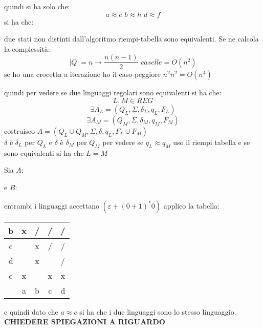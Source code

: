 \documentclass[a4paper,12pt, oneside]{book}
\begin{document}
quindi si ha solo che:
$$a\approx e\,\,b\approx h\,\,d\approx f$$
si ha che:
\begin{teorema}
due stati non distinti dall'algoritmo riempi-tabella sono equivalenti. Se ne calcola la complessità:
$$|Q|=n\to \frac{n(n-1)}{2}\,\,caselle=O(n^2)$$
se ho una crocetta a iterazione ho il caso peggiore $n^2n^2=O(n^4)$
\end{teorema}
quindi per vedere se due linguaggi regolari sono equivalenti si ha che:
$$L,M\in REG$$
$$\exists A_L=(Q_L,\Sigma,\delta_L,q_L,F_L)$$
$$\exists A_M=(Q_M,\Sigma,\delta_M,q_M,F_M)$$
costruisco $A=(Q_L\cup Q_M,\Sigma,\delta,q_L,F_L\cup F_M)$
\\$\delta$ è $\delta_L$ per $Q_L$ e $\delta$ è $\delta_M$ per $Q_M$
per vedere se $q_L\approx q_M$ uso il riempi tabella e se sono equivalenti si ha che $L=M$
\begin{esempio}
Sia $A$:
\begin{center}
\end{center}
e $B$:
\begin{center}
\end{center}
entrambi i linguaggi accettano $(\varepsilon+(0+1)^*0)$
applico la tabella:
\begin{center}
\begin{tabular}{c|c|c|c|c|}
\hline
b & x & / & / & / \\
\hline
c &  & x & / & / \\
\hline
d &  & x &  & / \\
\hline
e & x &  & x & x \\
\hline
& a & b & c & d\\
\hline 
\end{tabular}
\end{center}
e quindi dato che $a\approx c$ si ha che i due linguaggi sono lo stesso linguaggio. \\
\textbf{CHIEDERE SPIEGAZIONI A RIGUARDO}
\end{esempio}
\end{document}
